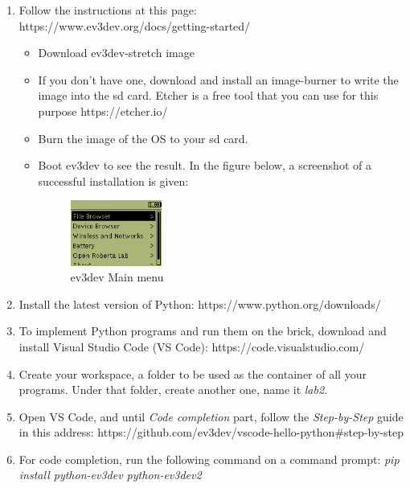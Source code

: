 \documentclass{scrartcl}
\begin{document}
\begin{enumerate}
    \item Follow the instructions at this page:\\ https://www.ev3dev.org/docs/getting-started/
    \begin{itemize}
        \item Download ev3dev-stretch image
        \item If you don't have one, download and install an image-burner to write the image into the sd card. Etcher is a free tool that you can use for this purpose https://etcher.io/
        \item Burn the image of the OS to your sd card.
        \item Boot ev3dev to see the result. In the figure below, a screenshot of a successful installation is given:
            \begin{figure}[h!]
                \begin{center}
                  \includegraphics[width=0.3\textwidth]{main-menu.png}
                  \caption{ev3dev Main menu}
                \end{center}
            \end{figure}
    \end{itemize}
    \item Install the latest version of Python: https://www.python.org/downloads/
    \item To implement Python programs and run them on the brick, download and install Visual Studio Code (VS Code): https://code.visualstudio.com/
    \item Create your workspace, a folder to be used as the container of all your programs. Under that folder, create another one, name it \textit{lab2}.
    \item Open VS Code, and until \textit{Code completion} part, follow the \textit{Step-by-Step} guide in this address: https://github.com/ev3dev/vscode-hello-python\#step-by-step
    \item For code completion, run the following command on a command prompt: \textit{pip install python-ev3dev python-ev3dev2}

\end{enumerate}
\end{document}
